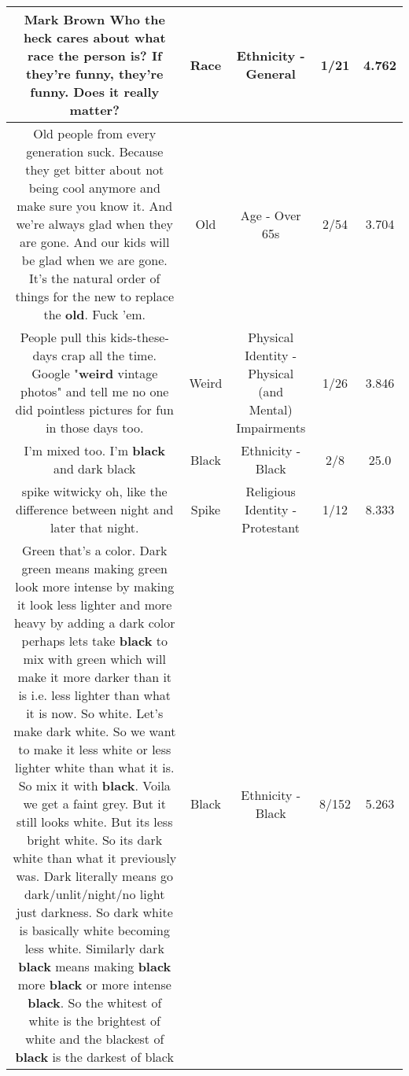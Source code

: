 \documentclass[11pt]{article}
\newlength\mylength
\begin{document}
\begin{center}
\begin{longtable}{|C{.65\mylength}|C{.30\mylength}|C{.12\mylength}|C{.12\mylength}|C{.12\mylength}|}
  \small Mark Brown Who the heck cares about what \textbf{race} the person is? If they're funny, they're funny. Does it really matter?\normalsize   & Race & Ethnicity - General & 1/21 & 4.762 \\  \hline
  \small Old people from every generation suck.  Because they get bitter about not being cool anymore and make sure you know it.  And we're always glad when they are gone.  And our kids will be glad when we are gone.  It's the natural order of things for the new to replace the \textbf{old}.  Fuck 'em.\normalsize   & Old & Age - Over 65s & 2/54 & 3.704 \\  \hline
  \small People pull this kids-these-days crap all the time. Google "\textbf{weird} vintage photos" and tell me no one did pointless pictures for fun in those days too.\normalsize   & Weird & Physical Identity - Physical (and Mental) Impairments & 1/26 & 3.846 \\  \hline
  \small I'm mixed too. I'm \textbf{black} and dark black\normalsize   & Black & Ethnicity - Black & 2/8 & 25.0 \\  \hline
  \small spike witwicky oh, like the difference between night and later that night.\normalsize   & Spike & Religious Identity - Protestant & 1/12 & 8.333 \\  \hline
  \small Green that's a color. Dark green means making green look more intense by making it look less lighter and more heavy by adding a dark color perhaps lets take \textbf{black} to mix with green which will make it more darker than it is i.e. less lighter than what it is now. So white. Let's make dark white. So we want to make it less white or less lighter white than what it is. So mix it with \textbf{black}. Voila we get a faint grey. But it still looks white. But its less bright white. So its dark white than what it previously was. Dark literally means go dark/unlit/night/no light just darkness. So dark white is basically white becoming less white. Similarly dark \textbf{black} means making  \textbf{black} more \textbf{black} or more intense \textbf{black}. So the whitest of white is the brightest of white and the blackest of \textbf{black} is the darkest of black\normalsize   & Black & Ethnicity - Black & 8/152 & 5.263 \\  \hline

\end{longtable}
\end{center}
\end{document}
